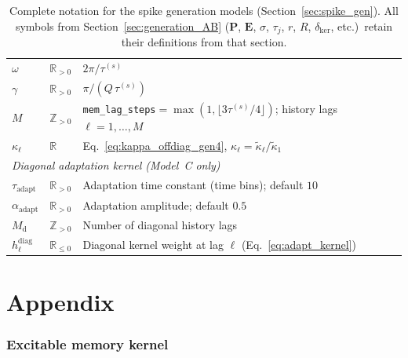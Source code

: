 \documentclass[11pt]{article}
\begin{document}
\begin{table}[h]
\begin{tabular}{lll}
$\omega$ & $\mathbb{R}_{>0}$ &
  $2\pi/\tau^{(s)}$ \\
$\gamma$ & $\mathbb{R}_{>0}$ &
  $\pi/(Q\,\tau^{(s)})$ \\
$M$    & $\mathbb{Z}_{>0}$ &
  \texttt{mem\_lag\_steps}$=\max(1,\lfloor 3\tau^{(s)}/4\rfloor)$; history lags $\ell=1,\dots,M$ \\
$\kappa_\ell$ & $\mathbb{R}$ &
  Eq.~\ref{eq:kappa_offdiag_gen4}, $\kappa_\ell=\tilde{\kappa}_\ell/\tilde{\kappa}_1$ \\
\midrule
\multicolumn{3}{l}{\textit{Diagonal adaptation kernel
  (Model~C only)}} \\
$\tau_{\mathrm{adapt}}$ & $\mathbb{R}_{>0}$ &
  Adaptation time constant (time bins); default $10$ \\
$\alpha_{\mathrm{adapt}}$ & $\mathbb{R}_{>0}$ &
  Adaptation amplitude; default $0.5$ \\
$M_{\mathrm{d}}$ & $\mathbb{Z}_{>0}$ &
  Number of diagonal history lags \\
$h^{\mathrm{diag}}_\ell$ & $\mathbb{R}_{\leq 0}$ & 
  Diagonal kernel weight at lag $\ell$
  (Eq.~\ref{eq:adapt_kernel}) \\
\bottomrule
\end{tabular}
\endgroup
\caption{Complete notation for the spike generation models
  (Section~\ref{sec:spike_gen}).
  All symbols from Section~\ref{sec:generation_AB}
  ($\mathbf{P}$, $\mathbf{E}$, $\sigma$, $\tau_j$, $r$, $R$,
  $\delta_{\mathrm{ker}}$, etc.)\ retain their definitions
  from that section.}
\label{tab:notation}
\end{table}

\appendix
\section*{\Huge Appendix}
\vspace{1cm}

\subsubsection{Excitable memory kernel}
\end{document}
